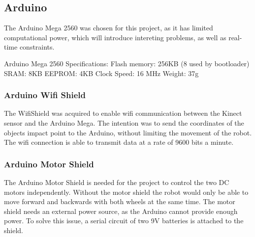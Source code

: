 
\subsection{Arduino}
\label{sec:Arduino}
The Arduino Mega 2560 was chosen for this project, as it has limited computational power, which will introduce intereting problems, as well as real-time constraints. \citep{a}

Arduino Mega 2560 Specifications:\newline
Flash memory: 256KB (8 used by bootloader)\newline
SRAM: 8KB\newline
EEPROM: 4KB\newline
Clock Speed: 16 MHz\newline
Weight: 37g

\subsubsection{Arduino Wifi Shield}
\label{sec: Arduino Wifi Shield}
The WifiShield was acquired to enable wifi communication between the Kinect sensor and the Arduino Mega. The intention was to send the coordinates of the objects impact point to the Arduino, without limiting the movement of the robot. The wifi connection is able to transmit data at a rate of 9600 bits a minute. 
\citep{aws}

\subsubsection{Arduino Motor Shield}
\label{sec:Arduino Motor Shield}
The Arduino Motor Shield is needed for the project to control the two DC motors independently. Without the motor shield the robot would only be able to move forward and backwards with both wheels at the same time. 
The motor shield needs an external power source, as the Arduino cannot provide enough power. To solve this issue, a serial circuit of two 9V batteries is attached to the shield. \citep{ams}

